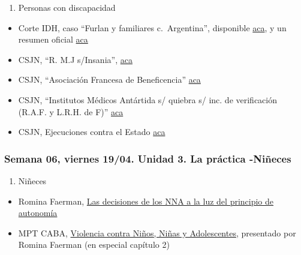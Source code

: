 \documentclass[
]{article}
\providecommand{\tightlist}{%
  \setlength{\itemsep}{0pt}\setlength{\parskip}{0pt}}
\begin{document}
\begin{enumerate}
\def\labelenumi{\alph{enumi}.}
\setcounter{enumi}{1}
\tightlist
\item
  Personas con discapacidad
\end{enumerate}

\begin{itemize}
\item
  Corte IDH, caso ``Furlan y familiares c.~Argentina'', disponible
  \href{https://www.corteidh.or.cr/docs/casos/articulos/seriec_246_esp.pdf}{aca},
  y un resumen oficial
  \href{https://www.corteidh.or.cr/docs/casos/articulos/resumen_246_esp.pdf}{aca}
\item
  CSJN, ``R. M.J s/Insania'',
  \href{https://drive.google.com/file/d/1c29zw3cQDmwNGuO-GDR15KUq7Xc-UZJb/view?usp=sharing}{aca}
\item
  CSJN, ``Asociación Francesa de Beneficencia''
  \href{https://drive.google.com/file/d/1hVROXu_IFbswD_0UtcBpXPZ0gEbTIiQJ/view?usp=share_link}{aca}
\item
  CSJN, ``Institutos Médicos Antártida s/ quiebra s/ inc. de
  verificación (R.A.F. y L.R.H. de F)''
  \href{https://drive.google.com/file/d/1THtTAOVsLhI8y5mQq5mNTLrt-LFdFc-K/view?usp=sharing}{aca}
\item
  CSJN, Ejecuciones contra el Estado
  \href{https://drive.google.com/file/d/1X2oK8aGhqhadJ7YkQCHktaT49Ypk5udZ/view?usp=share_link}{aca}
\end{itemize}

\hypertarget{semana-06-viernes-1904.-unidad-3.-la-pruxe1ctica--niuxf1eces}{%
\subsubsection{Semana 06, viernes 19/04. Unidad 3. La práctica
-Niñeces}\label{semana-06-viernes-1904.-unidad-3.-la-pruxe1ctica--niuxf1eces}}

\begin{enumerate}
\def\labelenumi{\alph{enumi}.}
\setcounter{enumi}{2}
\tightlist
\item
  Niñeces
\end{enumerate}

\begin{itemize}
\tightlist
\item
  Romina Faerman,
  \href{https://drive.google.com/file/d/1vjWDNx026ng38dl2I4G_ojXGlBQt23TT/view?usp=sharing}{Las
  decisiones de los NNA a la luz del principio de autonomía}
\item
  MPT CABA,
  \href{https://drive.google.com/file/d/1lc3H955K8Wx1-7mdtDAJX--CBBcqXfuX/view?usp=sharing}{Violencia
  contra Niños, Niñas y Adolescentes}, presentado por Romina Faerman (en
  especial capítulo 2)
\end{itemize}
\end{document}
